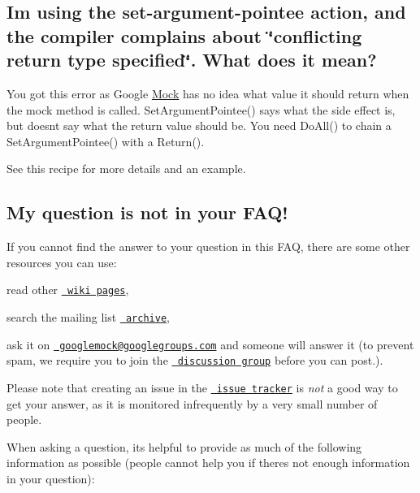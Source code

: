 \subsection*{I\textquotesingle{}m using the set-\/argument-\/pointee action, and the compiler complains about \char`\"{}conflicting return type specified\char`\"{}. What does it mean?}

You got this error as Google \mbox{\hyperlink{class_mock}{Mock}} has no idea what value it should return when the mock method is called. {\ttfamily Set\+Argument\+Pointee()} says what the side effect is, but doesn\textquotesingle{}t say what the return value should be. You need {\ttfamily Do\+All()} to chain a {\ttfamily Set\+Argument\+Pointee()} with a {\ttfamily Return()}.

See this recipe for more details and an example.

\subsection*{My question is not in your F\+A\+Q!}

If you cannot find the answer to your question in this F\+AQ, there are some other resources you can use\+:


\begin{DoxyEnumerate}
\item read other \href{http://code.google.com/p/googlemock/w/list}\texttt{ wiki pages},
\end{DoxyEnumerate}
\begin{DoxyEnumerate}
\item search the mailing list \href{http://groups.google.com/group/googlemock/topics}\texttt{ archive},
\end{DoxyEnumerate}
\begin{DoxyEnumerate}
\item ask it on \href{mailto:googlemock@googlegroups.com}\texttt{ googlemock@googlegroups.\+com} and someone will answer it (to prevent spam, we require you to join the \href{http://groups.google.com/group/googlemock}\texttt{ discussion group} before you can post.).
\end{DoxyEnumerate}

Please note that creating an issue in the \href{http://code.google.com/p/googlemock/issues/list}\texttt{ issue tracker} is {\itshape not} a good way to get your answer, as it is monitored infrequently by a very small number of people.

When asking a question, it\textquotesingle{}s helpful to provide as much of the following information as possible (people cannot help you if there\textquotesingle{}s not enough information in your question)\+:


